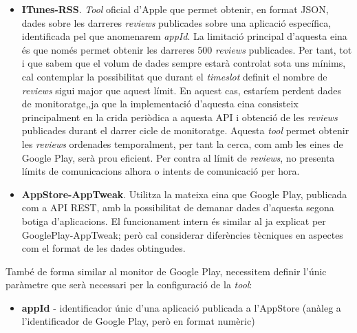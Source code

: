 \begin{itemize}
\item \textbf{ITunes-RSS}. \textit{Tool} oficial d'Apple \cite{rss} que permet obtenir, en format JSON, dades sobre les darreres \textit{reviews} publicades sobre una aplicació específica, identificada pel que anomenarem \textit{appId}. La limitació principal d'aquesta eina és que només permet obtenir les darreres 500 \textit{reviews} publicades. Per tant, tot i que sabem que el volum de dades sempre estarà controlat sota uns mínims, cal contemplar la possibilitat que durant el \textit{timeslot} definit el nombre de \textit{reviews} sigui major que aquest límit. En aquest cas, estaríem perdent dades de monitoratge,,ja que la implementació d'aquesta eina consisteix principalment en la crida periòdica a aquesta API i obtenció de les \textit{reviews} publicades durant el darrer cicle de monitoratge. Aquesta \textit{tool} permet obtenir les \textit{reviews} ordenades temporalment, per tant la cerca, com amb les eines de Google Play, serà prou eficient. Per contra al límit de \textit{reviews}, no presenta límits de comunicacions alhora o intents de comunicació per hora.
\item \textbf{AppStore-AppTweak}. Utilitza la mateixa eina que Google Play, publicada com a API REST, amb la possibilitat de demanar dades d'aquesta segona botiga d'aplicacions. El funcionament intern és similar al ja explicat per GooglePlay-AppTweak; però cal considerar diferències tècniques en aspectes com el format de les dades obtingudes.
\end{itemize}

També de forma similar al monitor de Google Play, necessitem definir l'únic paràmetre que serà necessari per la configuració de la \textit{tool}:

\begin{itemize}
\item \textbf{appId} - identificador únic d'una aplicació publicada a l'AppStore (anàleg a l'identificador de Google Play, però en format numèric)
\end{itemize}

